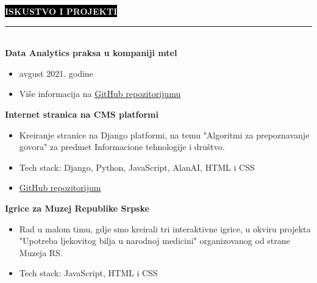 \documentclass[9pt]{developercv} %
\begin{document}
\colorbox{black}{{\textcolor{white}{\textbf{\MakeUppercase{Iskustvo i projekti}}}}}
\par\noindent\rule{\textwidth}{2px}\\

    {\textbf{Data Analytics praksa u kompaniji mtel}}
	\begin{itemize}
	    \item avgust 2021. godine
        \item [\faExternalLink] Više informacija na {\href{https://github.com/vladocodes/data-analytics-internship}{GitHub repozitorijumu}}\\

    \end{itemize}

\begin{minipage}[t]{0.45\textwidth}
	\vspace{-\baselineskip}
	
	{\textbf{Internet stranica na CMS platformi}}
	\begin{itemize}
        \item Kreiranje stranice na Django platformi, na temu "Algoritmi za prepoznavanje govora" za predmet Informacione tehnologije i društvo.
        \item Tech stack: Django, Python, JavaScript, AlanAI, HTML i CSS
        
        \item [\faExternalLink]{\href{https://github.com/vladocodes/PMF_ITAS_CMS}{GitHub repozitorijum}}
    \end{itemize}
\end{minipage}
\hfill
\begin{minipage}[t]{0.45\textwidth}
    \vspace{-\baselineskip}
    
    {\textbf{Igrice za Muzej Republike Srpske}}
    \begin{itemize}
        \item Rad u malom timu, gdje smo kreirali tri interaktivne igrice, u okviru projekta "Upotreba ljekovitog bilja u narodnoj medicini" organizovanog od strane Muzeja RS.
        \item  Tech stack: JavaScript, HTML i CSS
    \end{itemize}
\end{minipage}

\vspace{1cm}



\end{document}
